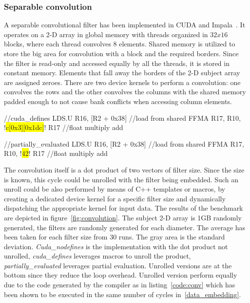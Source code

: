\subsubsection{Separable convolution}

A separable convolutional filter has been implemented in CUDA and Impala~\cite{CudaConv}. It operates on a 2-D array in global memory with threads organized in $32 x 16$ blocks, where each thread convolves 8 elements. Shared memory is utilized to store the big area for convolution with a block and the required borders. Since the filter is read-only and accessed equally by all the threads, it is stored in constant memory. Elements that fall away the borders of the 2-D subject array are assigned zeroes. There are two device kernels to perform a convolution: one convolves the rows and the other convolves the columns with the shared memory padded enough to not cause bank conflicts when accessing column elements.

\begin{code}[language=C,label=code:conv,caption=Convolution partial evaluation,escapechar=!]
//cuda_defines
LDS.U R16, [R2 + 0x38] //load from shared
FFMA R17, R10, !\colorbox{yellow}{c[0x3][0x1dc]}! R17 //float multiply add

//partially_evaluated
LDS.U R16, [R2 + 0x38] //load from shared
FFMA R17, R10, !\colorbox{yellow}{42}! R17 //float multiply add
\end{code}

The convolution itself is a dot product of two vectors of filter size. Since the size is known, this cycle could be unrolled with the filter being embedded. %
Such an unroll could be also performed by means of C++ templates or macros, by creating a dedicated device kernel for a specific filter size and dynamically dispatching the appropriate kernel for input data. The results of the benchmark are depicted in figure~\ref{fig:convolution}. The subject 2-D array is 1GB randomly generated, the filters are randomly generated for each diameter. The average has been taken for each filter size from 30 runs. The gray area is the standard deviation. \emph{Cuda\_nodefines} is the implementation with the dot product not unrolled, \emph{cuda\_defines} leverages macros to unroll the product, \emph{partially\_evaluated} leverages partial evaluation. Unrolled versions are at the bottom since they reduce the loop overhead. Unrolled version perform equally due to the code generated by the compiler as in listing~\ref{code:conv} which has been shown to be executed in the same number of cycles in~\ref{data_embedding}.

